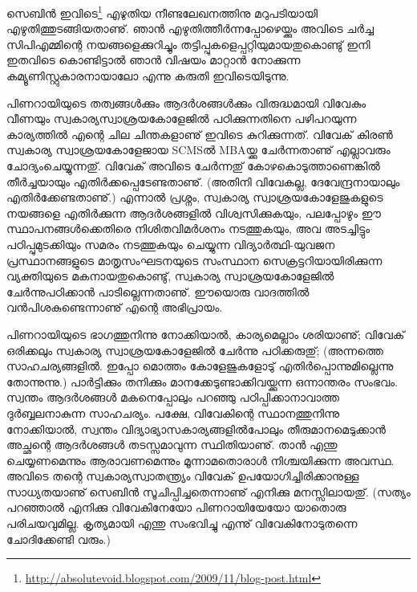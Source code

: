 ﻿
\vskip 2pt


സെബിന്‍ ഇവിടെ\footnote{\url{http://absolutevoid.blogspot.com/2009/11/blog-post.html}} എഴുതിയ നീണ്ടലേഖനത്തിനു മറുപടിയായി എഴുതിത്തുടങ്ങിയതാണു്. ഞാന്‍ എഴുതിത്തീര്‍ന്നപ്പോഴെയ്ക്കും അവിടെ ചര്‍ച്ച സിപിഎമ്മിന്റെ നയങ്ങളെക്കുറിച്ചും തട്ടിപ്പുകളെപ്പറ്റിയുമായതുകൊണ്ടു് ഇനി ഇതവിടെ കൊണ്ടിട്ടാല്‍ ഞാന്‍ വിഷയം മാറ്റാന്‍ നോക്കുന്ന കമ്യൂണിസ്റ്റുകാരനായാലോ എന്നു കരുതി ഇവിടെയിടുന്നു.

പിണറായിയുടെ തത്വങ്ങള്‍ക്കും ആദര്‍ശങ്ങള്‍ക്കും വിരുദ്ധമായി വിവേകും വീണയും സ്വകാര്യസ്വാശ്രയകോളേജില്‍ പഠിക്കുന്നതിനെ പഴിപറയുന്ന കാര്യത്തില്‍ എന്റെ ചില ചിന്തകളാണു് ഇവിടെ കുറിക്കുന്നത്. വിവേക് കിരണ്‍ സ്വകാര്യ സ്വാശ്രയകോളേജായ SCMSല്‍ MBAയ്ക്കു ചേര്‍ന്നതാണു് എല്ലാവരും ചോദ്യംചെയ്യുന്നതു്. വിവേക് അവിടെ ചേര്‍ന്നതു് കോഴകൊടുത്താണെങ്കില്‍ തീര്‍ച്ചയായും എതിര്‍ക്കപ്പെടേണ്ടതാണു്. (അതിനി വിവേകല്ല, ദേവേന്ദ്രനായാലും എതിര്‍ക്കേണ്ടതാണു്.) എന്നാല്‍ പ്രശ്നം, സ്വകാര്യ സ്വാശ്രയകോളേജുകളുടെ നയങ്ങളെ എതിര്‍ക്കുന്ന ആദര്‍ശങ്ങളില്‍ വിശ്വസിക്കുകയും, പലപ്പോഴും ഈ സ്ഥാപനങ്ങള്‍ക്കെതിരെ നിശിതവിമര്‍ശനം നടത്തുകയും, അവ അടച്ചിട്ടും പഠിപ്പുമുടക്കിയും സമരം നടത്തുകയും ചെയ്യുന്ന വിദ്യാര്‍ത്ഥി-യുവജന പ്രസ്ഥാനങ്ങളുടെ മാതൃസംഘടനയുടെ സംസ്ഥാന സെക്രട്ടറിയായിരിക്കുന്ന വ്യക്തിയുടെ മകനായതുകൊണ്ടു്, സ്വകാര്യ സ്വാശ്രയകോളേജില്‍ ചേര്‍ന്നുപഠിക്കാന്‍ പാടില്ലെന്നതാണു്. ഈയൊരു വാദത്തില്‍ വന്‍പിശകുണ്ടെന്നാണു് എന്റെ അഭിപ്രായം.

പിണറായിയുടെ ഭാഗത്തുനിന്നു നോക്കിയാല്‍, കാര്യമെല്ലാം ശരിയാണു്; വിവേക് ഒരിക്കലും സ്വകാര്യ സ്വാശ്രയകോളേജില്‍ ചേര്‍ന്നു പഠിക്കരുതു്; (അന്നത്തെ സാഹചര്യങ്ങളില്‍. ഇപ്പോ മൊത്തം കോളേജുകളോടു് എതിര്‍പ്പൊന്നുമില്ലെന്നു തോന്നുന്നു.) പാര്‍ട്ടിക്കും തനിക്കും മാനക്കേടുണ്ടാക്കിവയ്ക്കുന്ന ഒന്നാന്തരം സംഭവം. സ്വന്തം ആദര്‍ശങ്ങള്‍ മകനെപ്പോലും പറഞ്ഞു പഠിപ്പിക്കാനാവാത്ത ദുര്‍ബ്ബലനാകുന്ന സാഹചര്യം. പക്ഷേ, വിവേകിന്റെ സ്ഥാനത്തുനിന്നു നോക്കിയാല്‍, സ്വന്തം വിദ്യാഭ്യാസകാര്യങ്ങളില്‍പോലും തീരുമാനമെടുക്കാന്‍ അച്ഛന്റെ ആദര്‍ശങ്ങള്‍ തടസ്സമാവുന്ന സ്ഥിതിയാണു്. താന്‍ എന്തു ചെയ്യണമെന്നും ആരാവണമെന്നും മൂന്നാമതൊരാള്‍ നിശ്ചയിക്കുന്ന അവസ്ഥ. അവിടെ തന്റെ സ്വകാര്യസ്വാതന്ത്ര്യം വിവേക് ഉപയോഗിച്ചിരിക്കാനുള്ള സാധ്യതയാണു് സെബിന്‍ സൂചിപ്പിച്ചതെന്നാണു് എനിക്കു മനസ്സിലായതു്. (സത്യം പറഞ്ഞാല്‍ എനിക്കു വിവേകിനേയോ പിണറായിയേയോ യാതൊരു പരിചയവുമില്ല. കൃത്യമായി എന്തു സംഭവിച്ചു എന്നു് വിവേകിനോടുതന്നെ ചോദിക്കേണ്ടി വരും.)

